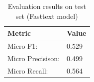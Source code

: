\begin{table}[b]
\center
\small
    \caption{Evaluation results on test set (Fasttext model)}
  \label{tab:eval_research_field}
  \begin{tabular}{ll}
  \toprule
      Metric & Value \\
  \midrule
      Micro F1:          & 0.529 \\
      Micro Precisison:  & 0.499 \\
      Micro Recall: 	 & 0.564 \\
  \bottomrule
\end{tabular}
\end{table}






